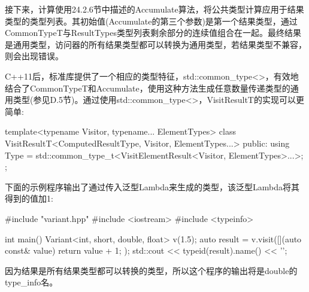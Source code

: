接下来，计算使用24.2.6节中描述的Accumulate算法，将公共类型计算应用于结果类型的类型列表。其初始值(Accumulate的第三个参数)是第一个结果类型，通过CommonTypeT与ResultTypes类型列表剩余部分的连续值组合在一起。最终结果是通用类型，访问器的所有结果类型都可以转换为通用类型，若结果类型不兼容，则会出现错误。

C++11后，标准库提供了一个相应的类型特征，std::common\_type<>，有效地结合了CommonTypeT和Accumulate，使用这种方法生成任意数量传递类型的通用类型(参见D.5节)。通过使用std::common\_type<>，VisitResultT的实现可以更简单:

\begin{cpp}
template<typename Visitor, typename... ElementTypes>
class VisitResultT<ComputedResultType, Visitor, ElementTypes...>
{
	public:
	using Type =
		std::common_type_t<VisitElementResult<Visitor, ElementTypes>...>;
};
\end{cpp}

下面的示例程序输出了通过传入泛型Lambda来生成的类型，该泛型Lambda将其得到的值加1:

\begin{cpp}
#include "variant.hpp"
#include <iostream>
#include <typeinfo>

int main()
{
	Variant<int, short, double, float> v(1.5);
	auto result = v.visit([](auto const& value) {
							return value + 1;
						});
	std::cout << typeid(result).name() << ’\n’;
}
\end{cpp}

因为结果是所有结果类型都可以转换的类型，所以这个程序的输出将是double的type\_info名。







